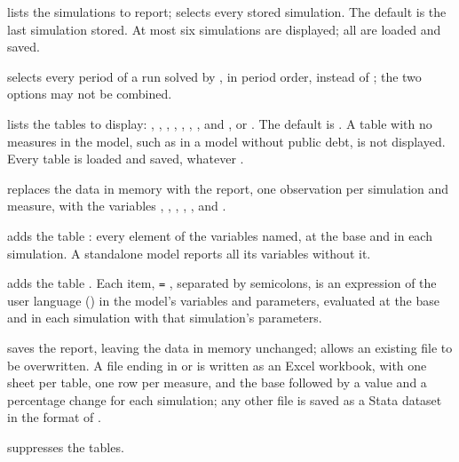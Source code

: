 \begin{optdesc}
\item[\optarg{sim}{s}{names}] lists the simulations to report; 
selects every stored simulation. The default is the last simulation stored. At
most six simulations are displayed; all are loaded and saved.

\item[\optarg{}{run}{name}] selects every period of a run solved by
, in period order, instead of ; the two
options may not be combined.

\item[\optarg{tab}{les}{list}] lists the tables to display: ,
, , , ,
, ,  and , or
. The default is . A table with no measures in the model, such as  in
a model without public debt, is not displayed. Every table is loaded and saved,
whatever .

\item[\opt{}{clear}] replaces the data in memory with the report, one
observation per simulation and measure, with the variables ,
, , , ,  and
.

\item[\optarg{var}{iables}{names}] adds the table : every
element of the variables named, at the base and in each simulation. A
standalone model reports all its variables without it.

\item[\optarg{item}{s}{items}] adds the table . Each item,
 \texttt{=} , separated by semicolons, is an
expression of the user language () in the model's
variables and parameters, evaluated at the base and in each simulation with
that simulation's parameters.

\item[\optarg{sav}{ing}{filename\textup{[\texttt{, replace}]}}] saves the
report, leaving the data in memory unchanged;  allows an existing
file to be overwritten. A file ending in  or  is written
as an Excel workbook, with one sheet per table, one row per measure, and the
base followed by a value and a percentage change for each simulation; any
other file is saved as a Stata dataset in the format of .

\item[\opt{nod}{isplay}] suppresses the tables.
\end{optdesc}

